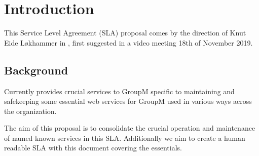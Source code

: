 \section{Introduction}
This Service Level Agreement (SLA) proposal comes by the direction of Knut Eide Løkhammer in \customername, first suggested in a video meeting 18th of November 2019.

\subsection{Background}
Currently \suppliername provides crucial services to GroupM specific to maintaining and safekeeping some essential web services for GroupM used in various ways across the organization. 

The aim of this proposal is to consolidate the crucial operation and maintenance of named known services in this SLA. Additionally we aim to create a human readable SLA with this document covering the essentials.

